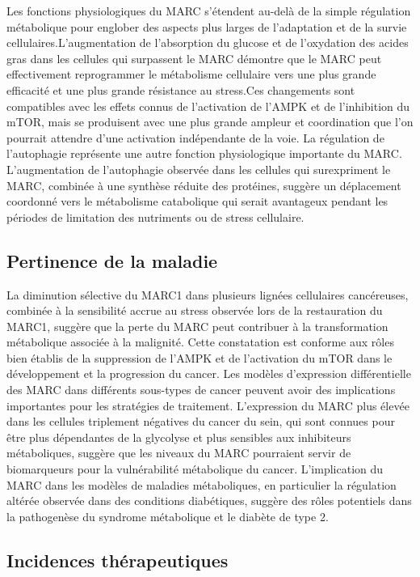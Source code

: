 \documentclass[11pt,a4paper]{article}
\begin{document}
Les fonctions physiologiques du MARC s'étendent au-delà de la simple régulation métabolique pour englober des aspects plus larges de l'adaptation et de la survie cellulaires.L'augmentation de l'absorption du glucose et de l'oxydation des acides gras dans les cellules qui surpassent le MARC démontre que le MARC peut effectivement reprogrammer le métabolisme cellulaire vers une plus grande efficacité et une plus grande résistance au stress.Ces changements sont compatibles avec les effets connus de l'activation de l'AMPK et de l'inhibition du mTOR, mais se produisent avec une plus grande ampleur et coordination que l'on pourrait attendre d'une activation indépendante de la voie. La régulation de l'autophagie représente une autre fonction physiologique importante du MARC. L'augmentation de l'autophagie observée dans les cellules qui surexpriment le MARC, combinée à une synthèse réduite des protéines, suggère un déplacement coordonné vers le métabolisme catabolique qui serait avantageux pendant les périodes de limitation des nutriments ou de stress cellulaire.

\subsection{Pertinence de la maladie}

La diminution sélective du MARC1 dans plusieurs lignées cellulaires cancéreuses, combinée à la sensibilité accrue au stress observée lors de la restauration du MARC1, suggère que la perte du MARC peut contribuer à la transformation métabolique associée à la malignité. Cette constatation est conforme aux rôles bien établis de la suppression de l'AMPK et de l'activation du mTOR dans le développement et la progression du cancer. Les modèles d'expression différentielle des MARC dans différents sous-types de cancer peuvent avoir des implications importantes pour les stratégies de traitement. L'expression du MARC plus élevée dans les cellules triplement négatives du cancer du sein, qui sont connues pour être plus dépendantes de la glycolyse et plus sensibles aux inhibiteurs métaboliques, suggère que les niveaux du MARC pourraient servir de biomarqueurs pour la vulnérabilité métabolique du cancer. L'implication du MARC dans les modèles de maladies métaboliques, en particulier la régulation altérée observée dans des conditions diabétiques, suggère des rôles potentiels dans la pathogenèse du syndrome métabolique et le diabète de type 2.

\subsection{Incidences thérapeutiques}
\end{document}
